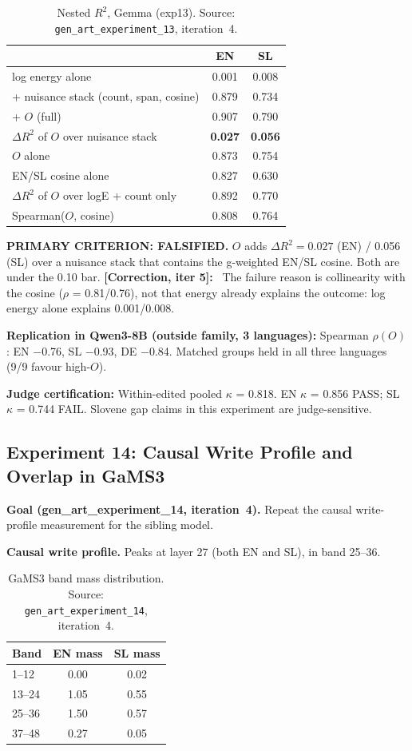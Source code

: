 \documentclass[11pt,letterpaper]{article}
\newcommand{\corr}[1]{\noindent\textbf{[Correction, iter #1]:}~}
\begin{document}
\begin{table}[!htbp]
\centering
\caption{Nested $R^2$, Gemma (exp13). Source: \texttt{gen\_art\_experiment\_13}, iteration~4.}
\label{tab:exp13_nested}
\small
\begin{tabular}{lcc}
\toprule
& EN & SL \\
\midrule
log energy alone & 0.001 & 0.008 \\
+ nuisance stack (count, span, cosine) & 0.879 & 0.734 \\
+ $O$ (full) & 0.907 & 0.790 \\
$\Delta R^2$ of $O$ over nuisance stack & \textbf{0.027} & \textbf{0.056} \\
$O$ alone & 0.873 & 0.754 \\
EN/SL cosine alone & 0.827 & 0.630 \\
$\Delta R^2$ of $O$ over logE + count only & 0.892 & 0.770 \\
Spearman($O$, cosine) & 0.808 & 0.764 \\
\bottomrule
\end{tabular}
\end{table}

\textbf{PRIMARY CRITERION: FALSIFIED.} $O$ adds $\Delta R^2 = 0.027$ (EN) / 0.056 (SL) over a nuisance stack that contains the g-weighted EN/SL cosine. Both are under the 0.10 bar. \corr{5} The failure reason is collinearity with the cosine ($\rho$ = 0.81/0.76), not that energy already explains the outcome: log energy alone explains 0.001/0.008.

\textbf{Replication in Qwen3-8B (outside family, 3 languages):} Spearman $\rho(O)$: EN $-$0.76, SL $-$0.93, DE $-$0.84. Matched groups held in all three languages (9/9 favour high-$O$).

\textbf{Judge certification:} Within-edited pooled $\kappa$ = 0.818. EN $\kappa$ = 0.856 PASS; SL $\kappa$ = 0.744 FAIL. Slovene gap claims in this experiment are judge-sensitive.


\subsection{Experiment 14: Causal Write Profile and Overlap in GaMS3}\label{sec:exp14}

\textbf{Goal (gen\_art\_experiment\_14, iteration~4).} Repeat the causal write-profile measurement for the sibling model.

\textbf{Causal write profile.} Peaks at layer 27 (both EN and SL), in band 25--36.

\begin{table}[!htbp]
\centering
\caption{GaMS3 band mass distribution. Source: \texttt{gen\_art\_experiment\_14}, iteration~4.}
\label{tab:exp14_bandmass}
\small
\begin{tabular}{lcc}
\toprule
Band & EN mass & SL mass \\
\midrule
1--12 & 0.00 & 0.02 \\
13--24 & 1.05 & 0.55 \\
25--36 & 1.50 & 0.57 \\
37--48 & 0.27 & 0.05 \\
\bottomrule
\end{tabular}
\end{table}
\end{document}
